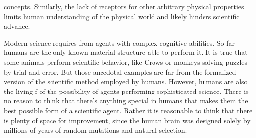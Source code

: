 \documentclass[11pt,a4paper,twoside]{report}
\newcommand{\+}{\textnormal{+} }
\theoremstyle{definition}
\numberwithin{equation}{chapter}
\begin{document}
concepts. Similarly, the lack of receptors for other arbitrary physical
properties limits human understanding of the physical world and likely hinders
scientific advance. \\ 
\par 
Modern science requires from agents with complex cognitive abilities. So far
humans are the only known material structure able to perform it. It is true that
some animals perform scientific behavior, like Crows or monkeys solving puzzles
by trial and error. But those anecdotal examples are far from the formalized
version of the scientific method employed by humans. However, humans are also
the living f of the possibility of agents performing sophisticated science.
There is no reason to think that there's anything special in humans that makes
them the best possible form of a scientific agent. Rather it is reasonable to
think that there is plenty of space for improvement, since the human brain was
designed solely by millions of years of random mutations and natural selection.
\end{document}
